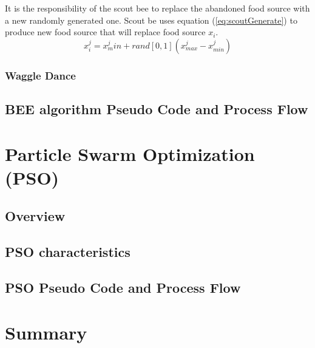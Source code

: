 It is the responsibility of the scout bee to replace the abandoned food source with a new randomly generated one. Scout be uses equation (\ref{eq:scoutGenerate}) to produce new food source that will replace food source $x_i$.
\begin{equation}
\label{eq:scoutGenerate}
x^j_i = x^j_min + rand[0,1](x^j_{max} - x^j_{min})
\end{equation}
\subsubsection{Waggle Dance}
\subsection{BEE algorithm Pseudo Code and Process Flow}

\section{Particle Swarm Optimization (PSO)}
\label{sec:PSO}
\subsection{Overview}
\subsection{PSO characteristics}
\subsection{PSO Pseudo Code and Process Flow}

\section{Summary}
